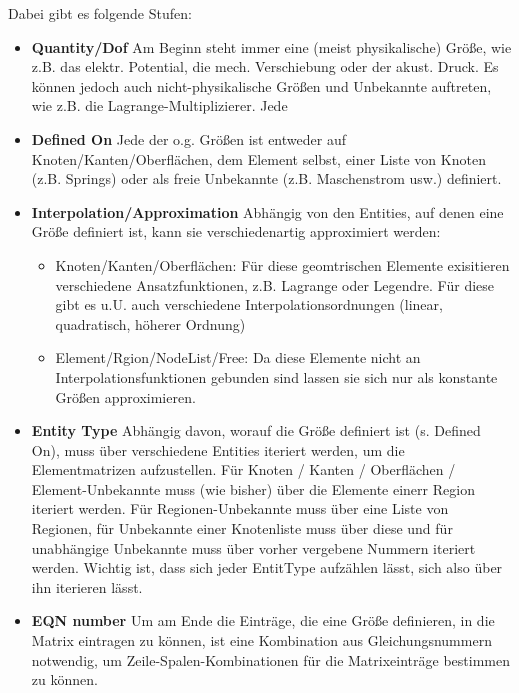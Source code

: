 \documentclass[12pt,a4paper]{article}
\begin{document}
\noindent
Dabei gibt es folgende Stufen:
\begin{itemize}
\item {\bf Quantity/Dof}\newline 
  Am Beginn steht immer eine (meist physikalische)
  Größe, wie z.B. das elektr. Potential, die mech. Verschiebung oder
  der akust. Druck. Es können jedoch auch nicht-physikalische Größen
  und Unbekannte auftreten, wie z.B. die Lagrange-Multiplizierer. Jede
\item {\bf Defined On} \newline
  Jede der o.g. Größen ist entweder auf
  Knoten/Kanten/Oberflächen, dem Element selbst, einer Liste von
  Knoten (z.B. Springs) oder als freie Unbekannte (z.B. Maschenstrom
  usw.) definiert.
\item {\bf Interpolation/Approximation} \newline 
  Abhängig von den Entities, auf
  denen eine Größe definiert ist, kann sie verschiedenartig
  approximiert werden:
  \begin{itemize}
  \item Knoten/Kanten/Oberflächen: Für diese geomtrischen Elemente
    exisitieren verschiedene Ansatzfunktionen, z.B. Lagrange oder
    Legendre. Für diese gibt es u.U. auch verschiedene
    Interpolationsordnungen (linear, quadratisch, höherer Ordnung)
  \item Element/Rgion/NodeList/Free: Da diese Elemente nicht an
    Interpolationsfunktionen gebunden sind lassen sie sich nur als
    konstante Größen approximieren.
  \end{itemize}
\item {\bf Entity Type} \newline
  Abhängig davon, worauf die Größe definiert ist (s. Defined On), muss
  über verschiedene Entities iteriert werden, um die Elementmatrizen
  aufzustellen. Für Knoten / Kanten / Oberflächen / Element-Unbekannte muss
  (wie bisher) über die Elemente einerr Region iteriert werden. Für
  Regionen-Unbekannte muss über eine Liste von Regionen, für
  Unbekannte einer Knotenliste muss über diese und für unabhängige
  Unbekannte muss über vorher vergebene Nummern iteriert
  werden. Wichtig ist, dass sich jeder EntitType aufzählen lässt,
  sich also über ihn iterieren lässt.
\item {\bf EQN number} \newline
  Um am Ende die Einträge, die eine Größe definieren, in die Matrix
  eintragen zu können, ist eine Kombination aus Gleichungsnummern
  notwendig, um Zeile-Spalen-Kombinationen für die Matrixeinträge
  bestimmen zu können.
\end{itemize}
\end{document}
